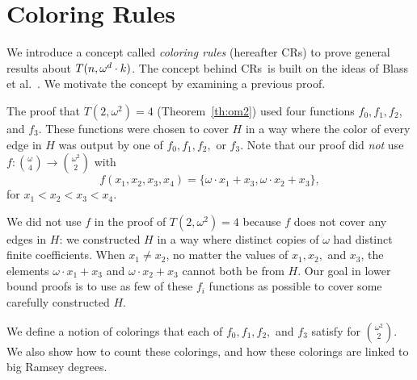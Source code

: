 \documentclass[10pt,a4paper]{article}
\newcommand{\om}{\omega}
\newcommand{\capcrules}{Coloring Rules}
\newcommand{\crulenospace}{CR}
\newcommand{\crulesLong}{coloring rules}
\newcommand{\crules}{\crulenospace s~}
\newcommand{\crulesnospace}{\crulenospace s}
\newcommand{\numpoints}{n}
\theoremstyle{plain}
\theoremstyle{definition}
\begin{document}
\section{\capcrules}\label{se:strong} 

We introduce a concept called {\it \crulesLong} (hereafter \crulesnospace) to prove 
general results about
\linebreak
$T(\numpoints,\omega^d \cdot\nobreak k)$.
The concept behind \crules is built on the
ideas of Blass et al.~\cite{BDR21}.
We motivate the concept by examining a previous proof.

The proof that $T(2, \om^2) = 4$ (Theorem~\ref{th:om2})
used four functions $f_0,f_1,f_2$, and $f_3$. 
These functions were chosen to cover $H$ in a way where the color of every edge in $H$ 
was output by one of $f_0,f_1,f_2,$ or $f_3$.
Note that our proof did {\it not} use
$f\colon \binom{\om}{4} \to \binom{\om^2}{2}$ with
$$f(x_1,x_2,x_3,x_4) = \{\om \cdot x_1 + x_3, \om \cdot x_2 + x_3\},$$
for $x_1 < x_2 < x_3 < x_4.$

We did not use $f$ in the proof of $T(2, \om^2) = 4$
because $f$ does not cover any edges in $H$: we constructed $H$ in a 
way where distinct copies of $\om$ had distinct finite coefficients. When $x_1 \neq x_2$, no matter the values of $x_1, x_2,$ and 
$x_3$, the elements 
$\om \cdot x_1 + x_3$ and $\om \cdot x_2 + x_3$ cannot both be from $H$. Our goal in lower bound
proofs is to use as few of these $f_i$ functions as possible to cover some carefully constructed
$H.$

We define a notion of colorings that each of $f_0,f_1,f_2,$ and $f_3$ satisfy for $\binom{\om^2}{2}.$
We also show how to count these colorings, and how these colorings are linked to big Ramsey degrees.
\end{document}
